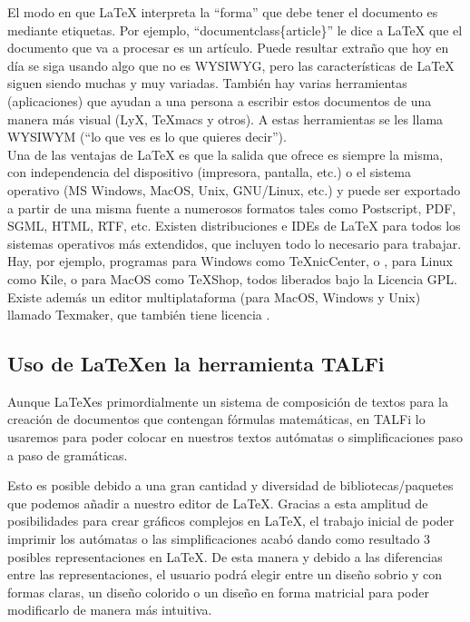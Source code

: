 \documentclass[12pt,a4paper,spanish]{book}
\begin{document}
El modo en que \LaTeX{} interpreta la ``forma'' que debe tener el documento es mediante etiquetas. Por ejemplo, ``documentclass\{article\}'' le dice a \LaTeX{} que el documento que va a procesar es un art\'iculo. Puede resultar extra\~no que hoy en d\'ia se siga usando algo que no es WYSIWYG, pero las caracter\'isticas de \LaTeX{} siguen siendo muchas y muy variadas. Tambi\'en hay varias herramientas (aplicaciones) que ayudan a una persona a escribir estos documentos de una manera m\'as visual (LyX, TeXmacs y otros). A estas herramientas se les llama WYSIWYM (``lo que ves es lo que quieres decir'').\\
\newpage
Una de las ventajas de \LaTeX{} es que la salida que ofrece es siempre la misma, con independencia del dispositivo (impresora, pantalla, etc.) o el sistema operativo (MS Windows, MacOS, Unix, GNU/Linux, etc.) y puede ser exportado a partir de una misma fuente a numerosos formatos tales como Postscript, PDF, SGML, HTML, RTF, etc. Existen distribuciones e IDEs de LaTeX para todos los sistemas operativos m\'as extendidos, que incluyen todo lo necesario para trabajar. Hay, por ejemplo, programas para Windows como TeXnicCenter,  o , para Linux como Kile, o para MacOS como TeXShop, todos liberados bajo la Licencia GPL. Existe adem\'as un editor multiplataforma (para MacOS, Windows y Unix) llamado Texmaker, que tambi\'en tiene licencia .

\subsection{Uso de \LaTeX en la herramienta TALFi}
Aunque \LaTeX es primordialmente un sistema de composici\'on de textos para la creaci\'on de documentos que contengan f\'ormulas matem\'aticas, en TALFi lo usaremos para poder colocar en nuestros textos aut\'omatas o simplificaciones paso a paso de gram\'aticas. 

Esto es posible debido a una gran cantidad y diversidad de bibliotecas/paquetes que podemos a\~nadir a nuestro editor de \LaTeX{}.
Gracias a esta amplitud de posibilidades para crear gr\'aficos complejos en \LaTeX{}, el trabajo inicial de poder imprimir los aut\'omatas o las simplificaciones acab\'o dando como resultado 3 posibles representaciones en \LaTeX{}. De esta manera y debido a las diferencias entre las representaciones, el usuario podr\'a elegir entre un dise\~no sobrio y con formas claras, un dise\~no colorido o un dise\~no en forma matricial para poder modificarlo de manera m\'as intuitiva.
\end{document}
